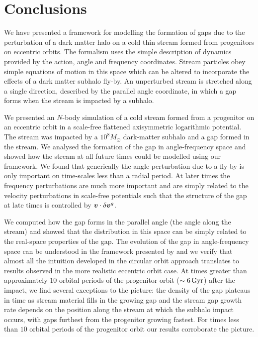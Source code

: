 \documentclass[useAMS,usenatbib,fleqn,a4paper]{mn2e}
\def\Gyr{\,{\rm Gyr}}
\newcommand{\bs}[1]{\bmath{#1}}
\begin{document}
\section{Conclusions}\label{Sect::Conclusions}
We have presented a framework for modelling the formation of gaps due to the perturbation of a dark matter halo on a cold thin stream formed from progenitors on eccentric orbits. The formalism uses the simple description of dynamics provided by the action, angle and frequency coordinates. Stream particles obey simple equations of motion in this space which can be altered to incorporate the effects of a dark matter subhalo fly-by. An unperturbed stream is stretched along a single direction, described by the parallel angle coordinate, in which a gap forms when the stream is impacted by a subhalo.

We presented an $N$-body simulation of a cold stream formed from a progenitor on an eccentric orbit in a scale-free flattened axisymmetric logarithmic potential. The stream was impacted by a $10^8M_\odot$ dark-matter subhalo and a gap formed in the stream. We analysed the formation of the gap in angle-frequency space and showed how the stream at all future times could be modelled using our framework. We found that generically the angle perturbation due to a fly-by is only important on time-scales less than a radial period. At later times the frequency perturbations are much more important and are simply related to the velocity perturbations in scale-free potentials such that the structure of the gap at late times is controlled by $\bs{v}\cdot\delta\bs{v}^g$.

We computed how the gap forms in the parallel angle (the angle along the stream) and showed that the distribution in this space can be simply related to the real-space properties of the gap. The evolution of the gap in angle-frequency space can be understood in the framework presented by \cite{ErkalBelokurov2015} and we verify that almost all the intuition developed in the circular orbit approach translates to results observed in the more realistic eccentric orbit case. At times greater than approximately $10$ orbital periods of the progenitor orbit ($\sim6\Gyr$) after the impact, we find several exceptions to the \cite{ErkalBelokurov2015} picture: the density of the gap plateaus in time as stream material fills in the growing gap and the stream gap growth rate depends on the position along the stream at which the subhalo impact occurs, with gaps furthest from the progenitor growing fastest. For times less than $10$ orbital periods of the progenitor orbit our results corroborate the \cite{ErkalBelokurov2015} picture.
\end{document}
